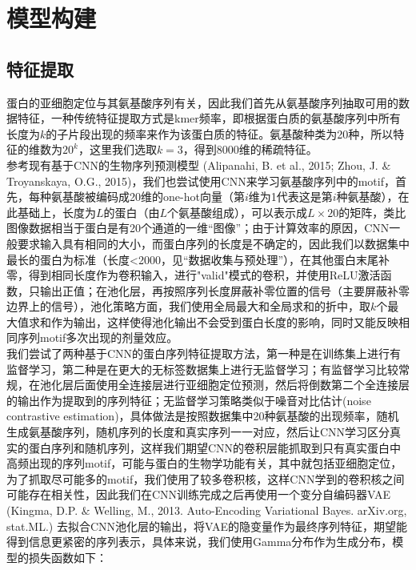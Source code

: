 \documentclass[a4paper,UTF8]{article}
\begin{document}
\section{模型构建}

\subsection{特征提取}

蛋白的亚细胞定位与其氨基酸序列有关，因此我们首先从氨基酸序列抽取可用的数据特征，一种传统特征提取方式是kmer频率，即根据蛋白质的氨基酸序列中所有长度为$k$的子片段出现的频率来作为该蛋白质的特征。氨基酸种类为20种，所以特征的维数为$20^k$，这里我们选取$k=3$，得到8000维的稀疏特征。\\

参考现有基于CNN的生物序列预测模型 (Alipanahi, B. et al., 2015; Zhou, J. $\&$ Troyanskaya, O.G., 2015)，我们也尝试使用CNN来学习氨基酸序列中的motif，首先，每种氨基酸被编码成20维的one-hot向量（第$i$维为1代表这是第$i$种氨基酸），在此基础上，长度为$L$的蛋白（由$L$个氨基酸组成），可以表示成$L\times 20$的矩阵，类比图像数据相当于蛋白是有20个通道的一维“图像”；由于计算效率的原因，CNN一般要求输入具有相同的大小，而蛋白序列的长度是不确定的，因此我们以数据集中最长的蛋白为标准（长度<2000，见“数据收集与预处理”），在其他蛋白末尾补零，得到相同长度作为卷积输入，进行"valid"模式的卷积，并使用ReLU激活函数，只输出正值；在池化层，再按照序列长度屏蔽补零位置的信号（主要屏蔽补零边界上的信号），池化策略方面，我们使用全局最大和全局求和的折中，取$k$个最大值求和作为输出，这样使得池化输出不会受到蛋白长度的影响，同时又能反映相同序列motif多次出现的剂量效应。\\

我们尝试了两种基于CNN的蛋白序列特征提取方法，第一种是在训练集上进行有监督学习，第二种是在更大的无标签数据集上进行无监督学习；有监督学习比较常规，在池化层后面使用全连接层进行亚细胞定位预测，然后将倒数第二个全连接层的输出作为提取到的序列特征；无监督学习策略类似于噪音对比估计(noise contrastive estimation)，具体做法是按照数据集中20种氨基酸的出现频率，随机生成氨基酸序列，随机序列的长度和真实序列一一对应，然后让CNN学习区分真实的蛋白序列和随机序列，这样我们期望CNN的卷积层能抓取到只有真实蛋白中高频出现的序列motif，可能与蛋白的生物学功能有关，其中就包括亚细胞定位，为了抓取尽可能多的motif，我们使用了较多卷积核，这样CNN学到的卷积核之间可能存在相关性，因此我们在CNN训练完成之后再使用一个变分自编码器VAE (Kingma, D.P. $\&$ Welling, M., 2013. Auto-Encoding Variational Bayes. arXiv.org, stat.ML.) 去拟合CNN池化层的输出，将VAE的隐变量作为最终序列特征，期望能得到信息更紧密的序列表示，具体来说，我们使用Gamma分布作为生成分布，模型的损失函数如下：
\end{document}
